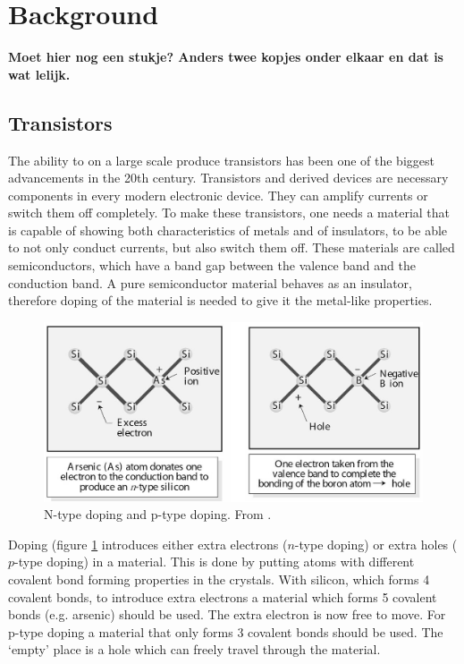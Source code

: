 \section{Background}
% 
\textbf{Moet hier nog een stukje? Anders twee kopjes onder elkaar en dat is wat lelijk.}
 
\subsection{Transistors}

The ability to on a large scale produce transistors has been one of the biggest advancements in the 20th century. Transistors and derived devices are necessary components in every modern electronic device. They can amplify currents or switch them off completely. To make these transistors, one needs a material that is capable of showing both characteristics of metals and of insulators, to be able to not only conduct currents, but also switch them off. These materials are called semiconductors, which have a band gap between the valence band and the conduction band. A pure semiconductor material behaves as an insulator, therefore doping of the material is needed to give it the metal-like properties.

\begin{figure}[!ht]
 \begin{center}
  \includegraphics[width=1\textwidth]{doping}
  \caption{N-type doping and p-type doping. From \citet{vanweesbook}.}
  \label{fig:doping}
 \end{center}
\end{figure}

Doping (figure \ref{fig:doping} introduces either extra electrons ($n$-type doping) or extra holes ($p$-type doping) in a material. This is done by putting atoms with different covalent bond forming properties in the crystals. With silicon, which forms 4 covalent bonds, to introduce extra electrons a material which forms 5 covalent bonds (e.g. arsenic) should be used. The extra electron is now free to move. For p-type doping a material that only forms 3 covalent bonds should be used. The `empty' place is a hole which can freely travel through the material.

